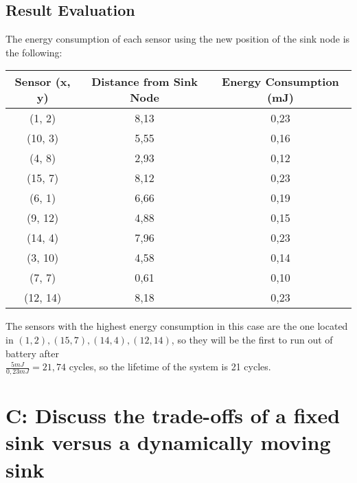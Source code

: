 \documentclass{Configuration_Files/PoliMi3i_thesis}
\begin{document}
\section{Result Evaluation}
The energy consumption of each sensor using the new position of the sink node is the following:
\begin{table}[h]
    \centering
    \begin{tabular}{c c c}
        \toprule
        \textbf{Sensor (x, y)} & \textbf{Distance from Sink Node} & \textbf{Energy Consumption (mJ)} \\
        \midrule
        (1, 2)   & 8,13  & 0,23 \\
        (10, 3)  & 5,55  & 0,16 \\
        (4, 8)   & 2,93  & 0,12 \\
        (15, 7)  & 8,12  & 0,23 \\
        (6, 1)   & 6,66  & 0,19 \\
        (9, 12)  & 4,88  & 0,15 \\
        (14, 4)  & 7,96  & 0,23 \\
        (3, 10)  & 4,58  & 0,14 \\
        (7, 7)   & 0,61  & 0,10 \\
        (12, 14) & 8,18  & 0,23 \\
        \bottomrule
    \end{tabular}
\end{table}

The sensors with the highest energy consumption in this case are the one located in $(1,2),(15,7),(14,4),(12,14)$, so they will be the first to run out of battery after \\ $\frac{5mJ}{0,23mJ}=21,74$ cycles, so the lifetime of the system is 21 cycles.

\chapter{C: Discuss the trade-offs of a fixed sink versus a dynamically moving sink}
\end{document}
